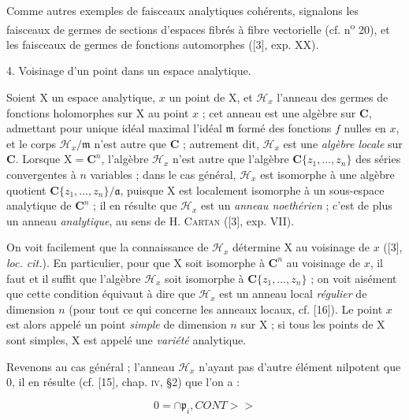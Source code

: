 Comme autres exemples de faisceaux analytiques cohérents, signalons les faisceaux de germes de sections d'espaces fibrés à fibre vectorielle (cf. n\textsuperscript{o} 20), et les faisceaux de germes de fonctions automorphes ([3], exp. XX).


4. Voisinage d'un point dans un espace analytique.

Soient $\mathrm{X}$ un espace analytique, $x$ un point de $\mathrm{X}$, et $\mathcal{H}_x$ l'anneau des germes de fonctions holomorphes sur $\mathrm{X}$ au point $x$ ; cet anneau est une algèbre sur $\mathbf{C}$, admettant pour unique idéal maximal l'idéal $\mathfrak{m}$ formé des fonctions $f$ nulles en $x$, et le corps $\mathcal{H}_x/\mathfrak{m}$ n'est autre que $\mathbf{C}$ ; autrement dit, $\mathcal{H}_x$ est une \textit{algèbre locale} sur $\mathbf{C}$. Lorsque $\mathrm{X} = \mathbf{C}^n$, l'algèbre $\mathcal{H}_x$ n'est autre que l'algèbre $\mathbf{C}\{z_1, \ldots, z_n\}$ des séries convergentes à $n$ variables ; dans le cas général, $\mathcal{H}_x$ est isomorphe à une algèbre quotient $\mathbf{C}\{z_1, \ldots, z_n\}/\mathfrak{a}$, puisque $\mathrm{X}$ est localement isomorphe à un sous-espace analytique de $\mathbf{C}^n$ ; il en résulte que $\mathcal{H}_x$ est un \textit{anneau noethérien} ; c'est de plus un anneau \textit{analytique}, au sens de H. \textsc{Cartan} ([3], exp. VII).

On voit facilement que la connaissance de $\mathcal{H}_x$ détermine $\mathrm{X}$ au voisinage de $x$ ([3], \textit{loc. cit.}). En particulier, pour que $\mathrm{X}$ soit isomorphe à $\mathbf{C}^n$ au voisinage de $x$, il faut et il suffit que l'algèbre $\mathcal{H}_x$ soit isomorphe à $\mathbf{C}\{z_1, \ldots, z_n\}$ ; on voit aisément que cette condition équivaut à dire que $\mathcal{H}_x$ est un anneau local \textit{régulier} de dimension $n$ (pour tout ce qui concerne les anneaux locaux, cf. [16]). Le point $x$ est alors appelé un point \textit{simple} de dimension $n$ sur $\mathrm{X}$ ; si tous les points de $\mathrm{X}$ sont simples, $\mathrm{X}$ est appelé une \textit{variété} analytique.

Revenons au cas général ; l'anneau $\mathcal{H}_x$ n'ayant pas d'autre élément nilpotent que 0, il en résulte (cf. [15], chap. \textsc{iv}, \S 2) que l'on a :

\begin{equation*}
0 = \cap \mathfrak{p}_i, CONT>>
\end{equation*}


